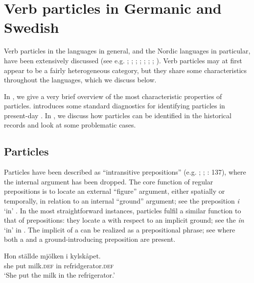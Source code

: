 \documentclass[output=paper]{langscibook}
\begin{document}
\section{Verb particles in Germanic and Swedish}\label{sec:lalu:2}


Verb particles in the  languages in general, and the Nordic languages in particular, have been extensively discussed (see e.g. \citealt{Afarli1985}; \citealt{Den_dikken1995}; \citealt{Svenonius1996}; \citealt{Wurmbrand2000}; \citealt{Dehe2002}; \citealt{RamchandSvenonius2002}; \citealt{Toivonen2003}; \citealt{Aa2015}). Verb particles may at first appear to be a fairly heterogeneous category, but they share some characteristics throughout the  languages, which we discuss below. 



In , we give a very brief overview of the most characteristic properties of particles.  introduces some standard diagnostics for identifying particles in present-day . In , we discuss how particles can be identified in the historical records and look at some problematic cases.


\subsection{Particles}\label{sec:lalu:2.1}

\begin{sloppypar}
Particles have been described as “intransitive prepositions” (e.g. \citealt{Emonds1976}; \citealt{Svenonius1996}; \citealt{Faarlund2019}: 137), where the internal argument has been dropped. The core function of regular prepositions is to locate an external “figure” argument, either spatially or temporally, in relation to an internal “ground” argument; see the  preposition \textit{i} ‘in’ . In the most straightforward instances, particles fulfil a similar function to that of prepositions: they locate a  with respect to an implicit ground; see the   \textit{in} ‘in’ in . The implicit  of a  can be realized as a prepositional phrase; see  where both a  and a ground-introducing preposition are present.
\end{sloppypar}

\ea\label{ex:lalu:3}
\ea\label{ex:lalu:3a}
\gll  Hon   ställde   mjölken     i     kylskåpet.\\
    she       put     milk\textsc{.def}   in   refridgerator.\textsc{def}\\
\glt `She put the milk in the refrigerator.'
\end{document}
